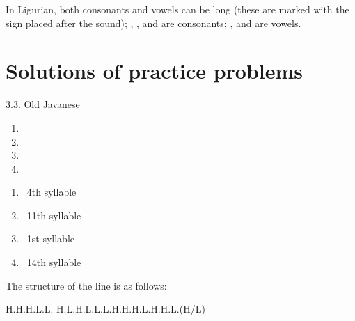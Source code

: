 \begin{refsection}
\begin{problem}{\langnameLigurian}{\nameKLiang}{}
\begin{tblsWarning}
In Ligurian, both consonants and vowels can be long (these are marked with the sign \cmubdata{:} placed after the sound); , ,  and  are consonants; ,  and  are vowels.
\end{tblsWarning}
\end{problem}

\hypertarget{solutions-of-practice-problems}{%
\section{Solutions of practice problems}}

\begin{practiceproblemsolution}{3.3. Old Javanese}
\begin{solutions}[label=Solution 3.3\alph*]
    \item
    \begin{enumerate}[label = V\arabic*:]
        \item {}
        \item {}
        \item {}
        \item {}
    \end{enumerate}
    \item \begin{enumerate}

        \item[]  \textrightarrow\ 4th syllable
        \item[]  \textrightarrow\ 11th syllable
        \item[]  \textrightarrow\ 1st syllable
        \item[]  \textrightarrow\ 14th syllable
    \end{enumerate}
\end{solutions}


The structure of the line is as follows:

\begin{center}
H.H.H.L.L. \quad H.L.H.L.L.\quad L.H.H.H.L.\quad H.H.L.(H/L)
\end{center}


\end{practiceproblemsolution}
\end{refsection}
